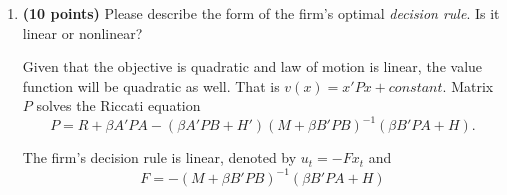\documentclass[12pt, oneside]{article}
\begin{document}
\begin{enumerate}
\begin{enumerate}
The monopolist's problem is represented as the following:
\[ v(x_t) = \max_{S_t, Q_t, I_t} \{ \pi(x_t, u_t) + \beta E_t[v(x_{t+1})] \} \]
\[ \mbox{subject to } \quad x_{t+1} = A x_t + B u_t + C \epsilon_{t+1} \]
where $\pi(x_t, u_t) = x'_tRx_t + u'_tMu_t + 2 u'_tHx_t$.

Matrix $R, M, H$ and $A, B, C$ are given below.
\[ R =\left [ \begin{array}{lll} 0&  0_{n \times 1} &  -d_1/2 \\
                                 0_{1 \times n} & 0_{n \times n} & 0_{1 \times n} \\
                                 -d_1/2 &  0_{n \times 1} & -d_2-d_3 \end{array} \right ] \]

\[ M =\left [ \begin{array}{ll}  -a_1 -d_3 & 0 \\ 0 & -c_2 \end{array} \right ] \quad
H = \left [ \begin{array}{lll} (a_0+G(1))/2 & G(2:n+1)/2 &  d_3 \\
                                 c_1/2 & 0_{n \times 1} & 0 \end{array} \right ] \]

\[ A = \left [ \begin{array}{ll} A_{22} & 0_{n+1 \times 1} \\ 0_{1 \times n+1} & 1 \end{array} \right ] \quad
B = \left [ \begin{array}{ll} 0_{n+1 \times 1} & 0_{n+1 \times 1} \\ -1 & 1 \end{array} \right ] \quad
C = \left [ \begin{array}{l} C_2 \\ 0_{1 \times k} \end{array} \right ] \]

\item \textbf{(10 points)} Please describe the form of the firm's optimal {\it decision rule\/}. Is it linear or nonlinear?

Given that the objective is quadratic and law of motion is linear, the value function will be quadratic as well. That is $v(x) = x'Px + constant$. Matrix $P$ solves the Riccati equation 
\[ P = R + \beta A'PA - (\beta A'PB+H') (M+\beta B'PB)^{-1} (\beta B'PA+H). \]

The firm's decision rule is linear, denoted by $u_t = -F x_t$ and 
\[ F= -(M+ \beta B'PB)^{-1}(\beta B'PA+H) \]


\end{enumerate}
\end{enumerate}
\end{document}
